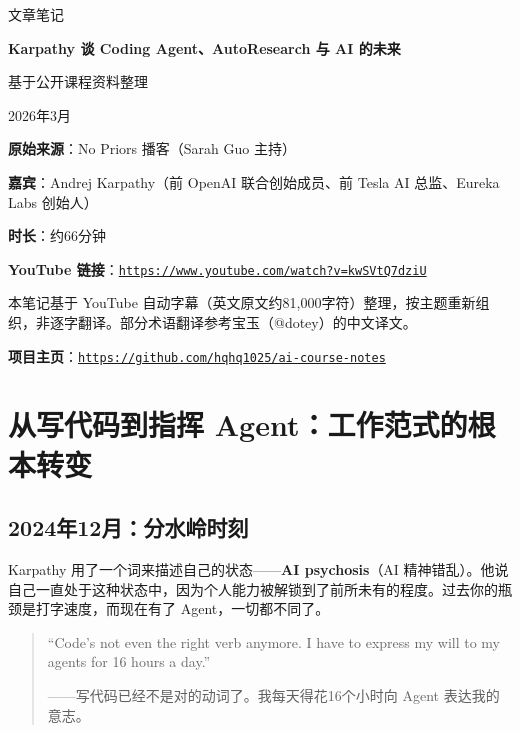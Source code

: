 \documentclass[a4paper]{article}
\newcommand{\notetitle}{Karpathy 谈 Coding Agent、AutoResearch 与 AI 的未来}
\newcommand{\noteauthors}{基于公开课程资料整理}
\newcommand{\notedate}{2026年3月}
\newcommand{\videoduration}{约66分钟}
\newcommand{\videourl}{https://www.youtube.com/watch?v=kwSVtQ7dziU}
\newcommand{\repourl}{https://github.com/hqhq1025/ai-course-notes}
\begin{document}
\begin{titlepage}
\centering
{\Large 文章笔记\par}
\vspace{1.2cm}
{\huge\bfseries \notetitle\par}
\vspace{0.8cm}
{\large \noteauthors\par}
\vspace{0.3cm}
{\large \notedate\par}
\vspace{1.5cm}

\vfill
\begin{tcolorbox}[width=0.9\textwidth, colback=black!2!white, colframe=black!60, sharp corners]
\textbf{原始来源}：No Priors 播客（Sarah Guo 主持）\par
\textbf{嘉宾}：Andrej Karpathy（前 OpenAI 联合创始成员、前 Tesla AI 总监、Eureka Labs 创始人）\par
\textbf{时长}：\videoduration\par
\textbf{YouTube 链接}：\href{\videourl}{\nolinkurl{\videourl}}\par
\vspace{0.3cm}
{\small 本笔记基于 YouTube 自动字幕（英文原文约81,000字符）整理，按主题重新组织，非逐字翻译。部分术语翻译参考宝玉（@dotey）的中文译文。}\par
\textbf{项目主页}：\href{\repourl}{\nolinkurl{\repourl}}\par
\end{tcolorbox}
\end{titlepage}

\tableofcontents
\newpage


\section{从写代码到指挥 Agent：工作范式的根本转变}

\subsection{2024年12月：分水岭时刻}

Karpathy 用了一个词来描述自己的状态——\textbf{AI psychosis}（AI 精神错乱）。他说自己一直处于这种状态中，因为个人能力被解锁到了前所未有的程度。过去你的瓶颈是打字速度，而现在有了 Agent，一切都不同了。

\begin{quote}
``Code's not even the right verb anymore. I have to express my will to my agents for 16 hours a day.''

——写代码已经不是对的动词了。我每天得花16个小时向 Agent 表达我的意志。
\end{quote}
\end{document}
